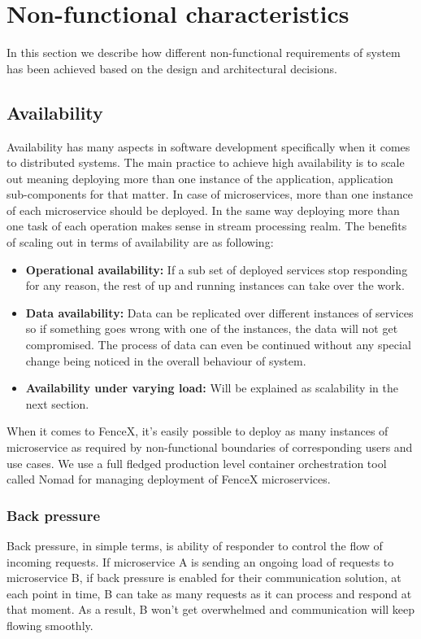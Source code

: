 \documentclass[a4]{report}
\begin{document}
    \section{Non-functional characteristics}
    In this section we describe how different non-functional requirements of system has been achieved based on the
    design and architectural decisions.

    \subsection{Availability}
    Availability has many aspects in software development specifically when it comes to distributed systems.
    The main practice to achieve high availability is to scale out meaning deploying more than one instance of the
    application, application sub-components for that matter.
    In case of microservices, more than one instance of each microservice should be deployed.
    In the same way deploying more than one task of each operation makes sense in stream processing realm.
    The benefits of scaling out in terms of availability are as following:
    \begin{itemize}
        \item \textbf{Operational availability:} If a sub set of deployed services stop responding for any
        reason, the rest of up and running instances can take over the work.
        \item \textbf{Data availability:} Data can be replicated over different instances of services so if
        something goes wrong with one of the instances, the data will not get compromised.
        The process of data can even be continued without any special change being noticed in the overall behaviour of
        system.
        \item \textbf{Availability under varying load:} Will be explained as scalability in the next section.
    \end{itemize}

    When it comes to FenceX, it's easily possible to deploy as many instances of microservice as required by
    non-functional boundaries of corresponding users and use cases.
    We use a full fledged production level container orchestration tool called Nomad\cite{nomad} for managing deployment of
    FenceX microservices.

    \subsubsection{Back pressure}
    Back pressure\cite{reactive-manifesto}, in simple terms, is ability of responder to control the flow of incoming requests.
    If microservice A is sending an ongoing load of requests to microservice B, if back pressure is enabled for
    their communication solution, at each point in time, B can take as many requests as it can process and respond at
    that moment.
    As a result, B won't get overwhelmed and communication will keep flowing smoothly.
\end{document}
